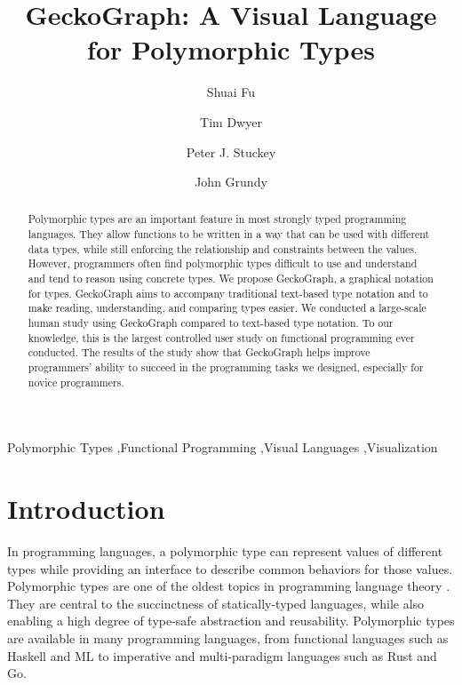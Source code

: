 \documentclass[preprint,12pt]{elsarticle}
\begin{document}
\begin{frontmatter}

 \author{Shuai Fu}

 \author{Tim Dwyer}

 \author{Peter J. Stuckey}

 \author{John Grundy}




\title{GeckoGraph: A Visual Language for Polymorphic Types}

\begin{abstract}
Polymorphic types are an important feature in most strongly typed programming languages. They allow functions to be written in a way that can be used with different data types, while still enforcing the relationship and constraints between the values. However, programmers often find polymorphic types difficult to use and understand and tend to reason using concrete types. We propose GeckoGraph, a graphical notation for types. GeckoGraph aims to accompany traditional text-based type notation and to make reading, understanding, and comparing types easier. We conducted a large-scale human study using GeckoGraph compared to text-based type notation. To our knowledge, this is the largest controlled user study on functional programming ever conducted. The results of the study show that GeckoGraph helps improve programmers' ability to succeed in the programming tasks we designed, especially for novice programmers.  
\end{abstract}

\begin{keyword}


Polymorphic Types \sep Functional Programming \sep Visual Languages \sep Visualization
\end{keyword}

\end{frontmatter}

\linenumbers

\section{Introduction} \label{sec:intro}
In programming languages, a polymorphic type \cite{Cardelli1987-fp} can represent values of different types while providing an interface to describe common behaviors for those values. Polymorphic types are one of the oldest topics in programming language theory \cite{Cardelli1987-fp}. They are central to the succinctness of statically-typed languages, while also enabling a high degree of type-safe abstraction and reusability. Polymorphic types are available in many programming languages, from functional languages such as Haskell and ML to imperative and multi-paradigm languages such as Rust\cite{Klabnik_undated-wx} and Go\cite{Griesemer_undated-ff}.
\end{document}
